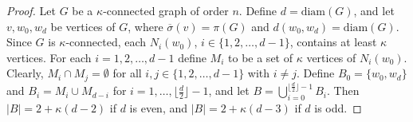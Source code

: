 \documentclass[a4paper,11pt]{article}
\begin{document}
\begin{proof}
Let \( G \) be a $\kappa$-connected graph of order $n$. 
Define $d = \text{diam}(G)$, and let $v, w_0, w_d$ be vertices of $G$, where $\overline{\sigma}(v) = \pi(G)$ 
and $d(w_0, w_d) = \text{diam}(G)$.  
Since $G$ is $\kappa$-connected, each $N_i(w_0)$, $i \in \{1,2,\ldots,d-1\}$, contains at least 
$\kappa$ vertices. For each $i = 1, 2, \ldots, d-1$  define $M_i$ to be a set of $\kappa$ vertices  of $N_i(w_0)$. 
Clearly, $M_i \cap M_j = \emptyset$ for all $i, j \in \{1,2,\ldots,d-1\}$ with $i\neq j$. 
Define $B_0 = \{w_0,w_d\}$ and $B_i = M_i \cup M_{d-i}$ for $i = 1, \ldots, \lfloor \frac{d}{2} \rfloor-1$, 
and let $B = \bigcup_{i=0}^{\lfloor \frac{d}{2} \rfloor -1} B_i$. Then $|B| = 2 + \kappa(d-2)$ if $d$ is even, 
and $|B|=2+\kappa(d-3)$ if $d$ is odd.  


\end{proof}
\end{document}
